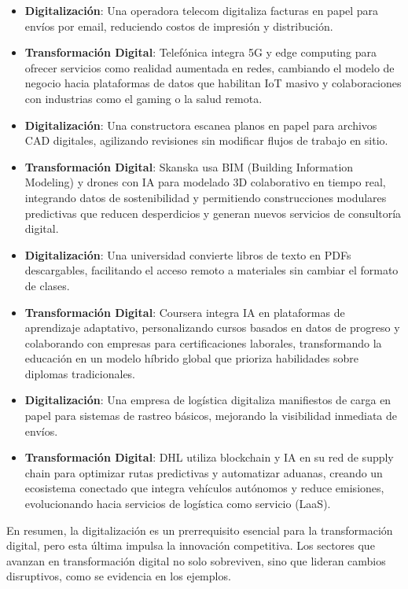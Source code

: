 \begin{itemize}
\item \textbf{Digitalización}: Una operadora telecom digitaliza facturas en papel para envíos por email, reduciendo costos de impresión y distribución.
\item \textbf{Transformación Digital}: Telefónica integra 5G y edge computing para ofrecer servicios como realidad aumentada en redes, cambiando el modelo de negocio hacia plataformas de datos que habilitan IoT masivo y colaboraciones con industrias como el gaming o la salud remota.
\end{itemize}

\begin{itemize}
\item \textbf{Digitalización}: Una constructora escanea planos en papel para archivos CAD digitales, agilizando revisiones sin modificar flujos de trabajo en sitio.
\item \textbf{Transformación Digital}: Skanska usa BIM (Building Information Modeling) y drones con IA para modelado 3D colaborativo en tiempo real, integrando datos de sostenibilidad y permitiendo construcciones modulares predictivas que reducen desperdicios y generan nuevos servicios de consultoría digital.
\end{itemize}

\begin{itemize}
\item \textbf{Digitalización}: Una universidad convierte libros de texto en PDFs descargables, facilitando el acceso remoto a materiales sin cambiar el formato de clases.
\item \textbf{Transformación Digital}: Coursera integra IA en plataformas de aprendizaje adaptativo, personalizando cursos basados en datos de progreso y colaborando con empresas para certificaciones laborales, transformando la educación en un modelo híbrido global que prioriza habilidades sobre diplomas tradicionales.
\end{itemize}

\begin{itemize}
\item \textbf{Digitalización}: Una empresa de logística digitaliza manifiestos de carga en papel para sistemas de rastreo básicos, mejorando la visibilidad inmediata de envíos.
\item \textbf{Transformación Digital}: DHL utiliza blockchain y IA en su red de supply chain para optimizar rutas predictivas y automatizar aduanas, creando un ecosistema conectado que integra vehículos autónomos y reduce emisiones, evolucionando hacia servicios de logística como servicio (LaaS).
\end{itemize}
En resumen, la digitalización es un prerrequisito esencial para la transformación digital, pero esta última impulsa la innovación competitiva. Los sectores que avanzan en transformación digital no solo sobreviven, sino que lideran cambios disruptivos, como se evidencia en los ejemplos.

